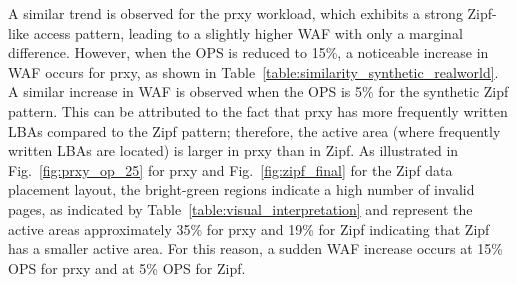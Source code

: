 \documentclass{ieeeaccess}
\begin{document}
A similar trend is observed for the prxy workload, which exhibits a strong Zipf-like access pattern, leading to a slightly higher WAF with only a marginal difference.
However, when the OPS is reduced to 15\%, a noticeable increase in WAF occurs for prxy, as shown in Table~\ref{table:similarity_synthetic_realworld}.
A similar increase in WAF is observed when the OPS is 5\% for the synthetic Zipf pattern. This can be attributed to the fact that prxy has more frequently written LBAs compared to the Zipf pattern; therefore, the active area (where frequently written LBAs are located) is larger in prxy than in Zipf. As illustrated in Fig.~\ref{fig:prxy_op_25} for prxy and Fig.~\ref{fig:zipf_final} for the Zipf data placement layout, the bright-green regions indicate a high number of invalid pages, as indicated by Table~\ref{table:visual_interpretation} and represent the active areas approximately 35\% for prxy and 19\% for Zipf indicating that Zipf has a smaller active area.
For this reason, a sudden WAF increase occurs at 15\% OPS for prxy and at 5\% OPS for Zipf. 
\end{document}
